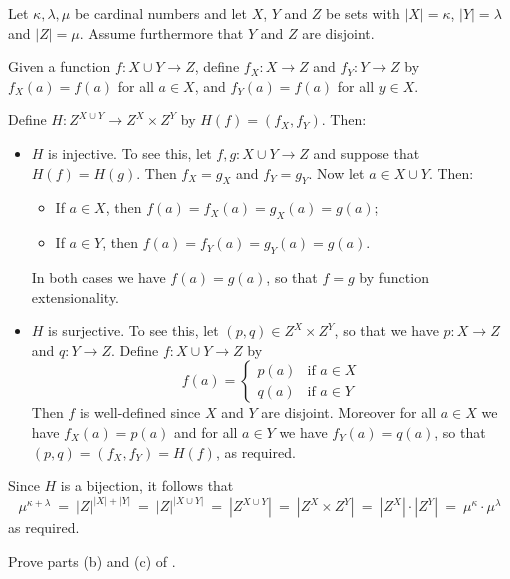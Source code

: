 \begin{cproof}[of {(a)}]
Let $\kappa, \lambda, \mu$ be cardinal numbers and let $X$, $Y$ and $Z$ be sets with $|X| = \kappa$, $|Y| = \lambda$ and $|Z| = \mu$. Assume furthermore that $Y$ and $Z$ are disjoint.

Given a function $f : X \cup Y \to Z$, define $f_X : X \to Z$ and $f_Y : Y \to Z$ by $f_X(a) = f(a)$ for all $a \in X$, and $f_Y(a) = f(a)$ for all $y \in X$.

Define $H : Z^{X \cup Y} \to Z^X \times Z^Y$ by $H(f) = (f_X, f_Y)$. Then:
\begin{itemize}
\item $H$ is injective. To see this, let $f,g : X \cup Y \to Z$ and suppose that $H(f) = H(g)$. Then $f_X = g_X$ and $f_Y = g_Y$. Now let $a \in X \cup Y$. Then:
\begin{itemize}
\item If $a \in X$, then $f(a) = f_X(a) = g_X(a) = g(a)$;
\item If $a \in Y$, then $f(a) = f_Y(a) = g_Y(a) = g(a)$.
\end{itemize}
In both cases we have $f(a)=g(a)$, so that $f=g$ by function extensionality.
\item $H$ is surjective. To see this, let $(p,q) \in Z^X \times Z^Y$, so that we have $p : X \to Z$ and $q : Y \to Z$. Define $f : X \cup Y \to Z$ by
\[ f(a) = \begin{cases} p(a) & \text{if } a \in X \\ q(a) & \text{if } a \in Y \end{cases} \]
Then $f$ is well-defined since $X$ and $Y$ are disjoint. Moreover for all $a \in X$ we have $f_X(a) = p(a)$ and for all $a \in Y$ we have $f_Y(a) = q(a)$, so that $(p,q) = (f_X,f_Y) = H(f)$, as required.
\end{itemize}

Since $H$ is a bijection, it follows that
\[ \mu^{\kappa+\lambda} ~=~ |Z|^{|X|+|Y|} ~=~ |Z|^{|X \cup Y|} ~=~ |Z^{X \cup Y}| ~=~ |Z^X \times Z^Y| ~=~ |Z^X| \cdot |Z^Y| ~=~ \mu^{\kappa} \cdot \mu^{\lambda} \]
as required.
\end{cproof}

\begin{exercise}
Prove parts (b) and (c) of .
\end{exercise}

